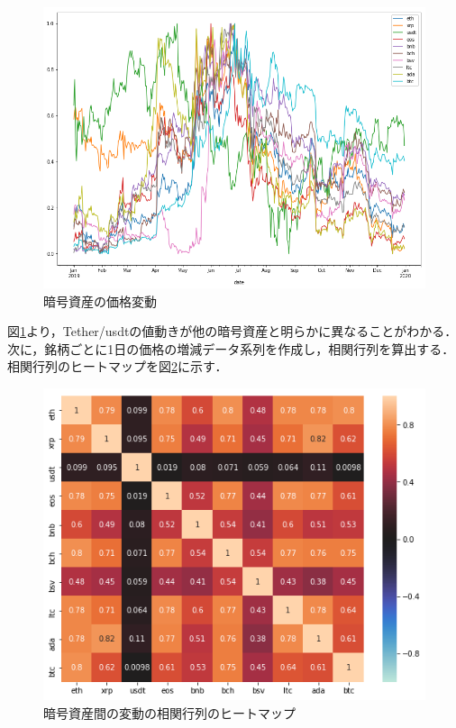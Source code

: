 \documentclass{jsarticle}
\begin{document}
	\begin{figure}
		\begin{center}
		\includegraphics[bb=0.000000 0.000000 821.187048 604.137609, width=0.8\linewidth]{img/price_series.png}
		\caption{暗号資産の価格変動}
		\label{fig:price_series}
		\end{center}
	\end{figure}
	
	図\ref{fig:price_series}より，Tether/usdtの値動きが他の暗号資産と明らかに異なることがわかる．
	次に，銘柄ごとに1日の価格の増減データ系列を作成し，相関行列を算出する．相関行列のヒートマップを図\ref{fig:corr_matrix}に示す．
	
	\begin{figure}
		\begin{center}
		\includegraphics[bb=0.000000 0.000000 508.115737 415.094549, width=0.7\linewidth]{img/correlation_matrix.png}
		\caption{暗号資産間の変動の相関行列のヒートマップ}
		\label{fig:corr_matrix}
		\end{center}
	\end{figure}
	
\end{document}
